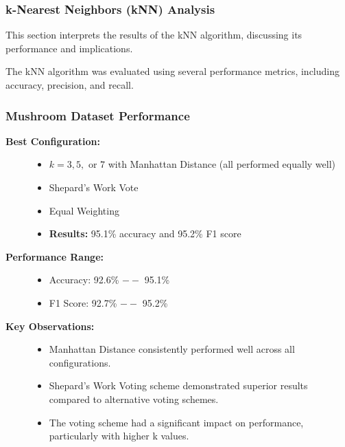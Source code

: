 \subsubsection{k-Nearest Neighbors (kNN) Analysis}
\label{subsubsec:discussion-knn}

This section interprets the results of the kNN algorithm, discussing its performance and implications.

The kNN algorithm was evaluated using several performance metrics, including accuracy, precision, and recall.

\subsubsection*{Mushroom Dataset Performance}

\begin{description}
    \item[\textbf{Best Configuration:}]\leavevmode
        \begin{itemize}
            \item $k = 3, 5,$ or $7$ with Manhattan Distance (all performed equally well)
            \item Shepard's Work Vote
            \item Equal Weighting
            \item \textbf{Results:} 95.1\% accuracy and 95.2\% F1 score
        \end{itemize}
    
    \item[\textbf{Performance Range:}]\leavevmode
        \begin{itemize}
            \item Accuracy: 92.6\% $--$ 95.1\%
            \item F1 Score: 92.7\% $--$ 95.2\%
        \end{itemize}
    
    \item[\textbf{Key Observations:}]\leavevmode
        \begin{itemize}
            \item Manhattan Distance consistently performed well across all configurations.
            \item Shepard's Work Voting scheme demonstrated superior results compared to alternative voting schemes.
            \item The voting scheme had a significant impact on performance, particularly with higher k values.
        \end{itemize}
\end{description}

